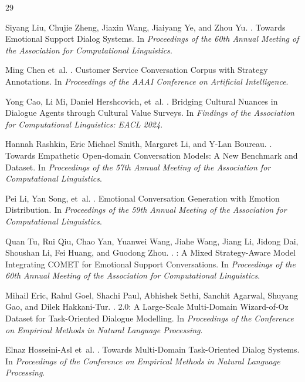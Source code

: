\documentclass[11pt]{article}
\begin{document}
\begin{table}[t]
\begin{thebibliography}{29}

Siyang Liu, Chujie Zheng, Jiaxin Wang, Jiaiyang Ye, and Zhou Yu.
.
\newblock Towards Emotional Support Dialog Systems.
\newblock In \emph{Proceedings of the 60th Annual Meeting of the Association for Computational Linguistics}.

Ming Chen et~al.
.
\newblock Customer Service Conversation Corpus with Strategy Annotations.
\newblock In \emph{Proceedings of the AAAI Conference on Artificial Intelligence}.

Yong Cao, Li Mi, Daniel Hershcovich, et~al.
.
\newblock Bridging Cultural Nuances in Dialogue Agents through Cultural Value Surveys.
\newblock In \emph{Findings of the Association for Computational Linguistics: EACL 2024}.

Hannah Rashkin, Eric Michael Smith, Margaret Li, and Y-Lan Boureau.
.
\newblock Towards Empathetic Open-domain Conversation Models: A New Benchmark and Dataset.
\newblock In \emph{Proceedings of the 57th Annual Meeting of the Association for Computational Linguistics}.

Pei Li, Yan Song, et~al.
.
\newblock Emotional Conversation Generation with Emotion Distribution.
\newblock In \emph{Proceedings of the 59th Annual Meeting of the Association for Computational Linguistics}.

Quan Tu, Rui Qiu, Chao Yan, Yuanwei Wang, Jiahe Wang, Jiang Li, Jidong Dai, Shoushan Li, Fei Huang, and Guodong Zhou.
.
: A Mixed Strategy-Aware Model Integrating {COMET} for Emotional Support Conversations.
\newblock In \emph{Proceedings of the 60th Annual Meeting of the Association for Computational Linguistics}.

Mihail Eric, Rahul Goel, Shachi Paul, Abhishek Sethi, Sanchit Agarwal, Shuyang Gao, and Dilek Hakkani-Tur.
.
 2.0: A Large-Scale Multi-Domain Wizard-of-Oz Dataset for Task-Oriented Dialogue Modelling.
\newblock In \emph{Proceedings of the Conference on Empirical Methods in Natural Language Processing}.

Elnaz Hosseini-Asl et~al.
.
\newblock Towards Multi-Domain Task-Oriented Dialog Systems.
\newblock In \emph{Proceedings of the Conference on Empirical Methods in Natural Language Processing}.


\end{thebibliography}
\end{table}
\end{document}
